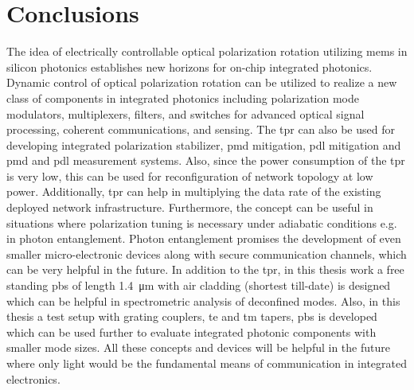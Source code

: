 \documentclass[../report.tex]{subfiles}
\begin{document}
		
\chapter{Conclusions}

The idea of electrically controllable optical polarization rotation utilizing \gls{mems} in silicon photonics establishes new horizons for on-chip integrated photonics. Dynamic control of optical polarization rotation can be utilized to realize a new class of components in integrated photonics including polarization mode modulators, multiplexers, filters, and switches for advanced optical signal processing, coherent communications, and sensing. The \gls{tpr} can also be used for developing integrated polarization stabilizer, \gls{pmd} mitigation, \gls{pdl} mitigation and \gls{pmd} and \gls{pdl} measurement systems. Also, since the power consumption of the \gls{tpr} is very low, this can be used for reconfiguration of network topology at low power. Additionally, \gls{tpr} can help in multiplying the data rate of the existing deployed network infrastructure. Furthermore, the concept can be useful in situations where polarization tuning is necessary under adiabatic conditions e.g. in photon entanglement. Photon entanglement promises the development of even smaller micro-electronic devices along with secure communication channels, which can be very helpful in the future. In addition to the \gls{tpr}, in this thesis work a free standing \gls{pbs} of length \SI{1.4}{\micro \meter} with air cladding (shortest till-date) is designed which can be helpful in spectrometric analysis of deconfined modes. Also, in this thesis a test setup with grating couplers, \gls{te} and \gls{tm} tapers, \gls{pbs} is developed which can be used further to evaluate integrated photonic components with smaller mode sizes. All these concepts and devices will be helpful in the future where only light would be the fundamental means of communication in integrated electronics.
\end{document}
